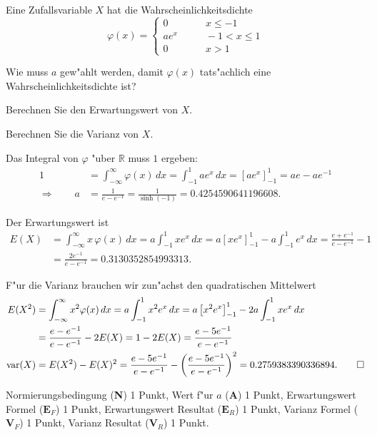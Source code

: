 Eine Zufallsvariable $X$ hat die Wahrscheinlichkeitsdichte
\[
\varphi(x)=\begin{cases}
0&\qquad x\le -1\\
ae^x&\qquad -1<x\le 1\\
0&\qquad x > 1
\end{cases}
\]
\begin{teilaufgaben}
\item Wie muss $a$ gew"ahlt werden, damit $\varphi(x)$ tats"achlich eine
Wahrscheinlichkeitsdichte ist?
\item Berechnen Sie den Erwartungswert von $X$.
\item Berechnen Sie die Varianz von $X$.
\end{teilaufgaben}

\begin{loesung}
\begin{teilaufgaben}
\item
Das Integral von $\varphi$ "uber $\mathbb R$ muss $1$ ergeben:
\begin{align*}
1
&=
\int_{-\infty}^{\infty} \varphi(x)\,dx
=
\int_{-1}^1ae^x\,dx
=
\left[ae^x\right]_{-1}^1
=
ae-ae^{-1}
\\
\Rightarrow\qquad
a&=\frac1{e-e^{-1}}=\frac1{\sinh(-1)}
=
0.4254590641196608.
\end{align*}
\item
Der Erwartungswert ist
\begin{align*}
E(X)
&=
\int_{-\infty}^\infty x\,\varphi(x)\,dx
=
a\int_{-1}^1xe^x\,dx
=
a\left[xe^x\right]_{-1}^1-a\int_{-1}^1e^x\,dx
=
\frac{e+e^{-1}}{e-e^{-1}}-1
\\
&=
\frac{2e^{-1}}{e-e^{-1}}
=
0.3130352854993313.
\end{align*}
\item
F"ur die Varianz brauchen wir zun"achst den quadratischen Mittelwert
\begin{align*}
E(X^2)
&=
\int_{-\infty}^\infty x^2\varphi(x)\, dx
=
a\int_{-1}^1 x^2e^x\,dx
=
a\left[x^2e^x\right]_{-1}^1
-
2a\int_{-1}^1xe^x\,dx
\\
&=
\frac{e-e^{-1}}{e-e^{-1}}
-2E(X)
=
1-2E(X)
=
\frac{e-5e^{-1}}{e-e^{-1}}
\\
\operatorname{var}(X)
&=
E(X^2)-E(X)^2
=
\frac{e-5e^{-1}}{e-e^{-1}}
-
\biggl(
\frac{e-5e^{-1}}{e-e^{-1}}
\biggr)^2
=
0.2759383390336894.
\qedhere
\end{align*}
\end{teilaufgaben}
\end{loesung}

\begin{bewertung}
Normierungsbedingung ({\bf N}) 1 Punkt,
Wert f"ur $a$ ({\bf A}) 1 Punkt,
Erwartungswert Formel ($\textbf{E}_F$) 1 Punkt,
Erwartungswert Resultat ($\textbf{E}_R$) 1 Punkt,
Varianz Formel ($\textbf{V}_F$) 1 Punkt,
Varianz Resultat ($\textbf{V}_R$) 1 Punkt.
\end{bewertung}




